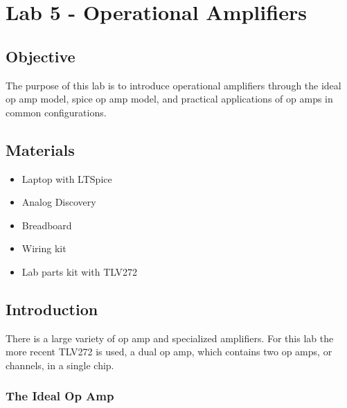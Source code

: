 \chapter{Lab 5 - Operational Amplifiers}

\section{Objective}

The purpose of this lab is to introduce  operational amplifiers through the ideal op amp model, spice op amp model, and practical applications of op amps in common configurations. 

\section{Materials}

\begin{itemize}
	\item Laptop with LTSpice
	\item Analog Discovery
	\item Breadboard
	\item Wiring kit
	\item Lab parts kit with TLV272
\end{itemize}

\section{Introduction}

There is a large variety of op amp and specialized amplifiers. For this lab the more recent TLV272 is used, a dual op amp, which contains two op amps, or channels, in a single chip.

\subsection{The Ideal Op Amp}

